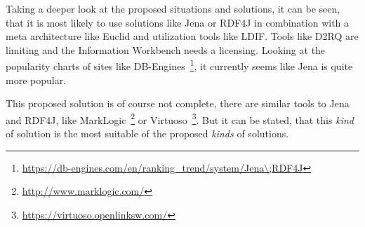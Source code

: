 Taking a deeper look at the proposed situations and solutions, it can be seen, that it is most likely to use solutions like Jena or RDF4J in combination with a meta architecture like Euclid and utilization tools like LDIF. Tools like D2RQ are limiting and the Information Workbench needs a licensing. Looking at the popularity charts of sites like DB-Engines~\footnote{\url{https://db-engines.com/en/ranking_trend/system/Jena\;RDF4J}}, it currently seems like Jena is quite more popular.

This proposed solution is of course not complete, there are similar tools to Jena and RDF4J, like MarkLogic~\footnote{\url{http://www.marklogic.com/}} or Virtuoso~\footnote{\url{https://virtuoso.openlinksw.com/}}. But it can be stated, that this \textit{kind} of solution is the most suitable of the proposed \textit{kinds} of solutions.